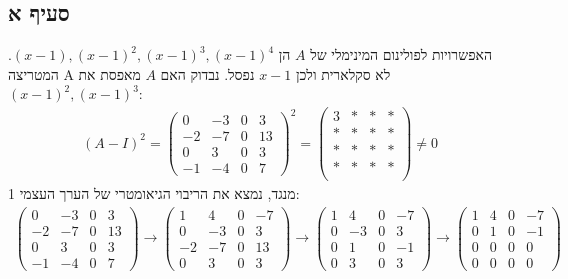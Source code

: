 \documentclass{article}
\begin{document}
\subsection*{סעיף א}

האפשרויות לפולינום המינימלי של $A$ הן $(x-1), (x-1)^2, (x-1)^3, (x-1)^4$. המטריצה A לא סקלארית ולכן $x-1$ נפסל. נבדוק האם $A$ מאפסת את $(x-1)^2, (x-1)^3$:
\begin{align*}
    (A-I)^2=\begin{pmatrix}
                0  & -3 & 0 & 3  \\
                -2 & -7 & 0 & 13 \\
                0  & 3  & 0 & 3  \\
                -1 & -4 & 0 & 7
            \end{pmatrix}^2=\begin{pmatrix}
                                3    & \ast & \ast & \ast \\
                                \ast & \ast & \ast & \ast \\
                                \ast & \ast & \ast & \ast \\
                                \ast & \ast & \ast & \ast \\
                            \end{pmatrix}\ne 0
\end{align*}
מנגד, נמצא את הריבוי הגיאומטרי של הערך העצמי 1:
\begin{align*}
    \begin{pmatrix}
        0  & -3 & 0 & 3  \\
        -2 & -7 & 0 & 13 \\
        0  & 3  & 0 & 3  \\
        -1 & -4 & 0 & 7
    \end{pmatrix} \rightarrow
    \begin{pmatrix}
        1  & 4  & 0 & -7 \\
        0  & -3 & 0 & 3  \\
        -2 & -7 & 0 & 13 \\
        0  & 3  & 0 & 3
    \end{pmatrix}\rightarrow
    \begin{pmatrix}
        1 & 4  & 0 & -7 \\
        0 & -3 & 0 & 3  \\
        0 & 1  & 0 & -1 \\
        0 & 3  & 0 & 3
    \end{pmatrix}\rightarrow
    \begin{pmatrix}
        1 & 4 & 0 & -7 \\
        0 & 1 & 0 & -1 \\
        0 & 0 & 0 & 0  \\
        0 & 0 & 0 & 0
    \end{pmatrix}
\end{align*}
\end{document}
